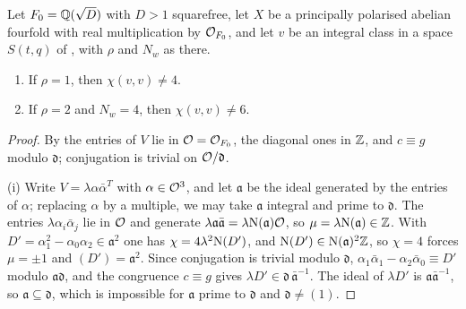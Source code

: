 \begin{proposition}
\label{prop:quarticother}
Let $F_{0}=\mathbb{Q}(\sqrt D)$ with $D>1$ squarefree, let $X$ be a principally
polarised abelian fourfold with real multiplication by $\mathcal{O}_{F_{0}}$, and let
$v$ be an integral class in a space $S(t,q)$ of ,
with $\rho$ and $N_{w}$ as there.
\begin{enumerate}[label=\textup{(\roman*)},leftmargin=2.6em,itemsep=2pt]
\item If $\rho=1$, then $\chi(v,v)\ne4$.
\item If $\rho=2$ and $N_{w}=4$, then $\chi(v,v)\ne6$.
\end{enumerate}
\end{proposition}

\begin{proof}
By  the entries of $V$ lie in $\mathcal{O}=\mathcal{O}_{F_{0}}$, the
diagonal ones in $\mathbb{Z}$, and $c\equiv g$ modulo $\mathfrak d$; conjugation is
trivial on $\mathcal{O}/\mathfrak d$.

(i) Write $V=\lambda\alpha\bar\alpha^{T}$ with $\alpha\in\mathcal{O}^{3}$, and let
$\mathfrak a$ be the ideal generated by the entries of $\alpha$; replacing
$\alpha$ by a multiple, we may take $\mathfrak a$ integral and prime to
$\mathfrak d$. The entries $\lambda\alpha_{i}\bar\alpha_{j}$ lie in $\mathcal{O}$ and
generate $\lambda\mathfrak a\bar{\mathfrak a}=\lambda\mathrm{N}(\mathfrak a)\mathcal{O}$, so
$\mu=\lambda\mathrm{N}(\mathfrak a)\in\mathbb{Z}$. With $D'=\alpha_{1}^{2}-\alpha_{0}\alpha_{2}
\in\mathfrak a^{2}$ one has $\chi=4\lambda^{2}\mathrm{N}(D')$, and
$\mathrm{N}(D')\in\mathrm{N}(\mathfrak a)^{2}\mathbb{Z}$, so $\chi=4$ forces $\mu=\pm1$ and
$(D')=\mathfrak a^{2}$. Since conjugation is trivial modulo $\mathfrak d$,
$\alpha_{1}\bar\alpha_{1}-\alpha_{2}\bar\alpha_{0}\equiv D'$ modulo
$\mathfrak a\mathfrak d$, and the congruence $c\equiv g$ gives
$\lambda D'\in\mathfrak d\,\bar{\mathfrak a}^{-1}$. The ideal of $\lambda D'$ is
$\mathfrak a\bar{\mathfrak a}^{-1}$, so $\mathfrak a\subseteq\mathfrak d$, which
is impossible for $\mathfrak a$ prime to $\mathfrak d$ and $\mathfrak d\ne(1)$.


\end{proof}
